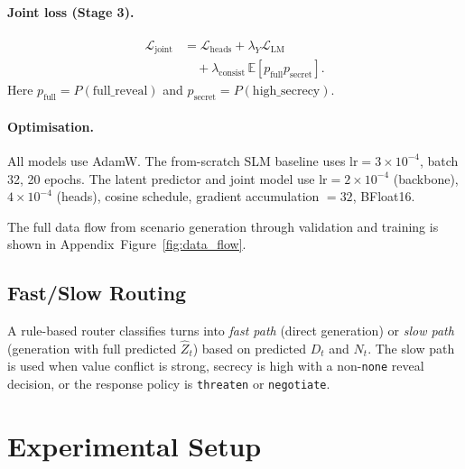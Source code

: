 \documentclass[11pt]{article}
\begin{document}
\paragraph{Joint loss (Stage 3).}
\label{sec:joint}
\begin{equation}
    \begin{aligned}
    \mathcal{L}_\text{joint}
    &= \mathcal{L}_\text{heads} + \lambda_Y \mathcal{L}_\text{LM} \\
    &\quad + \lambda_\text{consist}\,\mathbb{E}[p_\text{full}p_\text{secret}].
    \end{aligned}
\end{equation}
Here $p_\text{full}=P(\text{full\_reveal})$ and $p_\text{secret}=P(\text{high\_secrecy})$.

\paragraph{Optimisation.}
All models use AdamW.
The from-scratch SLM baseline uses $\text{lr}=3 \times 10^{-4}$, batch 32, 20 epochs.
The latent predictor and joint model use $\text{lr}=2 \times 10^{-4}$ (backbone), $4 \times 10^{-4}$ (heads), cosine schedule, gradient accumulation $=32$, BFloat16.

The full data flow from scenario generation through validation and training is shown in Appendix~Figure~\ref{fig:data_flow}.

\subsection{Fast/Slow Routing}
\label{sec:routing}

A rule-based router classifies turns into \textit{fast path} (direct generation) or \textit{slow path} (generation with full predicted $\hat{Z}_t$) based on predicted $D_t$ and $N_t$.
The slow path is used when value conflict is strong, secrecy is high with a non-\texttt{none} reveal decision, or the response policy is \texttt{threaten} or \texttt{negotiate}.

\section{Experimental Setup}
\label{sec:experiments}
\end{document}

